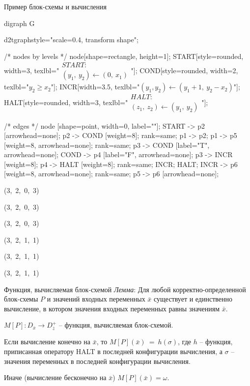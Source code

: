 \documentclass{beamer}
\begin{document}
	\begin{frame}[fragile]{Пример блок-схемы и вычисления}
	\setlength{\columnsep}{8cm}
	
	\begin{multicols}{2}
	
	\huge
	\begin{dot2tex}[options=-traw]
	digraph G{
		d2tgraphstyle="scale=0.4, transform shape";
		
		/* nodes by levels */
		node[shape=rectangle, height=1];
		START[style=rounded, width=3, texlbl="$\begin{matrix}START:\\ (y_1,~y_2) \leftarrow (0,~x_1)\end{matrix}$"];
		COND[style=rounded, width=2, texlbl="$y_2 \geq x_2$"];
		INCR[width=3.5, texlbl="$(y_1, y_2) \leftarrow (y_1 + 1,~y_2 - x_2)$"];
		HALT[style=rounded, width=3, texlbl="$\begin{matrix}HALT:\\  (z_1,~z_2) \leftarrow (y_1,~y_2)\end{matrix}$"];
				
		/* edges */
		node [shape=point, width=0, label=""];
		START -> p2 [arrowhead=none]; p2 -> COND [weight=8];
		{ rank=same; p1 -> p2; }
		p1 -> p5 [weight=8, arrowhead=none];
		{ rank=same; p3 -> COND [label="T", arrowhead=none]; COND -> p4 [label="F", arrowhead=none]; }
		p3 -> INCR [weight=8];
		p4 -> HALT [weight=8];
		{ rank=same; INCR; HALT; }
		INCR -> p6 [weight=8, arrowhead=none];
		{ rank=same; p5 -> p6 [arrowhead=none]; }
	}
	\end{dot2tex}
	
	\large
	
	(3,~2,~0,~3)
	
	(3,~2,~0,~3)
	
	(3,~2,~0,~3)
	
	(3,~2,~1,~1)
	
	(3,~2,~1,~1)
	
	(3,~2,~1,~1)
	
	
	\end{multicols}

	\end{frame}


	\begin{frame}{Функция, вычисляемая блок-схемой}
	\emph{Лемма}: Для любой корректно-определенной блок-схемы $P$ и значений входных переменных $\bar{x}$
	существует и единственно вычисление, в котором значения входных переменных равны значениям $\bar{x}$.

	$M[P] : D_{\bar{x}} \rightarrow D_{\bar{z}}^{+}$ -- функция, вычисляемая блок-схемой.

	Если вычисление конечно на $\bar{x}$, то $M[P](\bar{x})~=~h(\sigma)$, где $h$ -- функция, приписанная
	оператору HALT в последней конфигурации вычисления, а $\sigma$ -- значения переменных в последней конфигурации вычисления.

	Иначе (вычисление бесконечно на $\bar{x}$) $M[P](\bar{x}) = \omega$.
	\end{frame}
\end{document}
